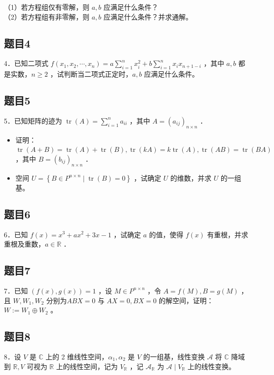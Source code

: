 \documentclass{article}
\begin{document}
（1）若方程组仅有零解，则 \(a, b\) 应满足什么条件？\\
（2）若方程组有非零解，则 \(a, b\) 应满足什么条件？并求通解。

\subsection{题目4}
4．已知二项式 \(f\left(x_{1}, x_{2}, \cdots, x_{n}\right)=a \sum_{i=1}^{n} x_{i}^{2}+b \sum_{i=1}^{n} x_{i} x_{n+1-i}\) ，其中 \(a, b\) 都是实数，\(n \geq 2\) ，试判断当二项式正定时，\(a, b\) 应满足什么条件。

\subsection{题目5}
5．已知矩阵的迹为 \(\operatorname{tr}(A)=\sum_{i=1}^{n} a_{i i}\) ，其中 \(A=\left(a_{i j}\right)_{n \times n}\) ．

\begin{itemize}
  \item[（1）] 证明： \(\operatorname{tr}(A+B)=\operatorname{tr}(A)+\operatorname{tr}(B), \operatorname{tr}(k A)=k \operatorname{tr}(A), \operatorname{tr}(A B)=\operatorname{tr}(B A)\) ，其中 \(B=\left(b_{i j}\right)_{n \times n}\) ．
  \item[（2）] 空间 \(U=\left\{B \in P^{n \times n} \mid \operatorname{tr}(B)=0\right\}\) ，试确定 \(U\) 的维数，并求 \(U\) 的一组基。
\end{itemize}

\subsection{题目6}
6．已知 \(f(x)=x^{3}+a x^{2}+3 x-1\) ，试确定 \(a\) 的值，使得 \(f(x)\) 有重根，并求重根及重数，\(a \in \mathbb{R}\) ．

\subsection{题目7}
7．已知 \((f(x), g(x))=1\) ，设 \(M \in P^{n \times n}\) ，令 \(A=f(M), B=g(M)\) ，且 \(W, W_{1}, W_{2}\) 分别为\(A B X=0\) 与 \(A X=0, B X=0\) 的解空间，证明：\(W:=W_{1} \oplus W_{2}\) 。

\subsection{题目8}
8．设 \(V\) 是 \(\mathbb{C}\) 上的 2 维线性空间，\(\alpha_{1}, \alpha_{2}\) 是 \(V\) 的一组基，线性变换 \(\mathcal{A}\) 将 \(\mathbb{C}\) 降域到 \(\mathbb{R}, V\) 可视为 \(\mathbb{R}\) 上的线性空间，记为 \(V_{\mathbb{R}}\) ，记 \(\mathcal{A}_{\mathbb{R}}\) 为 \(\mathcal{A} \mid V_{\mathbb{R}}\) 上的线性变换。
\end{document}
